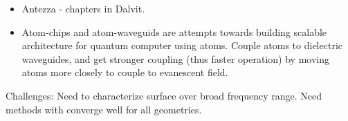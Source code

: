 \begin{itemize}
\item Antezza - chapters in Dalvit.  
\item Atom-chips and atom-waveguids are attempts towards building scalable 
architecture for quantum computer using atoms.
Couple atoms to dielectric waveguides, and get stronger coupling (thus faster operation)
by moving atoms more closely to couple to evanescent field.  
\end{itemize}
Challenges:  Need to characterize surface over broad frequency range.
Need methods with converge well for all geometries.  

